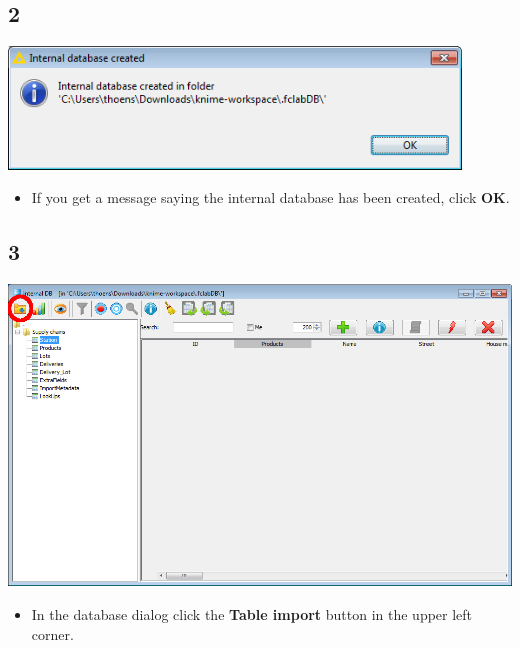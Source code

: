\documentclass{beamer}
\begin{document}
\subsection{2}
\begin{frame}
	\begin{center}
  		\includegraphics[width=0.9\textwidth]{2.png}
	\end{center}
	\begin{itemize}
		\item If you get a message saying the internal database has been created, click \textbf{OK}.
	\end{itemize}
\end{frame}

\subsection{3}
\begin{frame}
	\begin{center}
  		\includegraphics[height=0.6\textheight]{3.png}
	\end{center}
	\begin{itemize}
		\item In the database dialog click the \textbf{Table import} button in the upper left corner.
	\end{itemize}
\end{frame}
\end{document}
